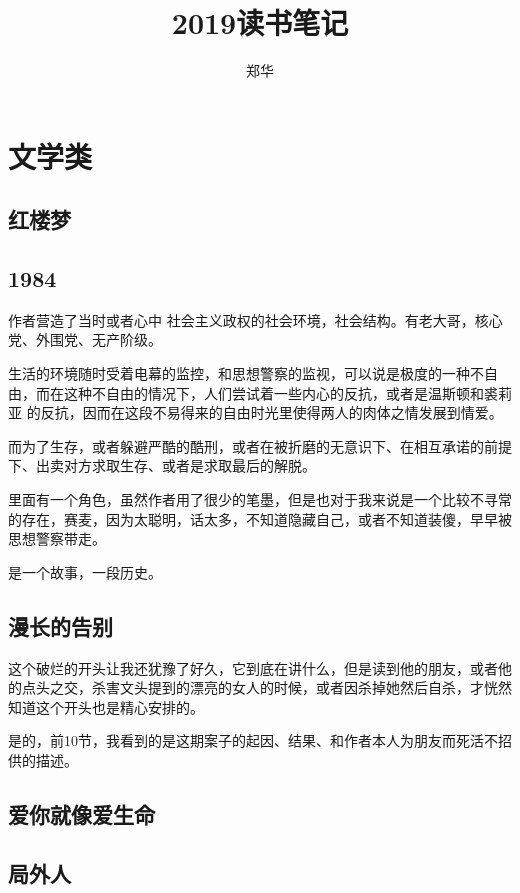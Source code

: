 \documentclass[UTF8,a4paper,12pt]{ctexbook}
\author{\kaishu 郑华}
\title{\heiti 2019读书笔记}
\begin{document}
 	\maketitle

\chapter{文学类}
	\section{红楼梦}
		
	\section{1984}
		作者营造了当时或者心中 社会主义政权的社会环境，社会结构。有老大哥，核心党、外围党、无产阶级。
		
		生活的环境随时受着电幕的监控，和思想警察的监视，可以说是极度的一种不自由，而在这种不自由的情况下，人们尝试着一些内心的反抗，或者是温斯顿和裘莉亚 的反抗，因而在这段不易得来的自由时光里使得两人的肉体之情发展到情爱。
		
		而为了生存，或者躲避严酷的酷刑，或者在被折磨的无意识下、在相互承诺的前提下、出卖对方求取生存、或者是求取最后的解脱。
		
		里面有一个角色，虽然作者用了很少的笔墨，但是也对于我来说是一个比较不寻常的存在，赛麦，因为太聪明，话太多，不知道隐藏自己，或者不知道装傻，早早被思想警察带走。
		
		是一个故事，一段历史。
		
	\section{漫长的告别}
		这个破烂的开头让我还犹豫了好久，它到底在讲什么，但是读到他的朋友，或者他的点头之交，杀害文头提到的漂亮的女人的时候，或者因杀掉她然后自杀，才恍然知道这个开头也是精心安排的。
		
		是的，前10节，我看到的是这期案子的起因、结果、和作者本人为朋友而死活不招供的描述。
		
	
	\section{爱你就像爱生命}
		
	\section{局外人}
	
\end{document}
